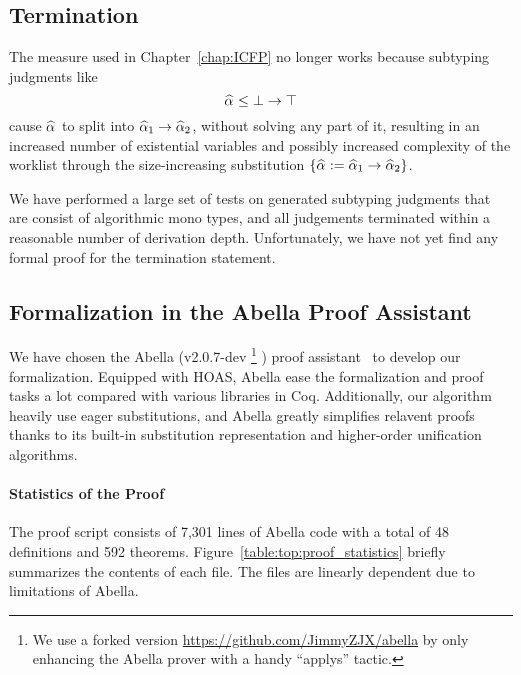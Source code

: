 \subsection{Termination}

The measure used in Chapter~\ref{chap:ICFP} no longer works because subtyping judgments like
$$\al \le \bot \to \top$$
cause $\al$ to split into $\al[1] \to \al[2]$, without solving any part of it,
resulting in an increased number of existential variables
and possibly increased complexity of the worklist through the size-increasing substitution
$\{\al := \al[1] \to \al[2]\}$.

We have performed a large set of tests on generated subtyping judgments
that are consist of algorithmic mono types,
and all judgements terminated within a reasonable number of derivation depth.
Unfortunately, we have not yet find any formal proof for the termination statement.

\subsection{Formalization in the Abella Proof Assistant}

We have chosen the Abella (v2.0.7-dev
\footnote{We use a forked version \url{https://github.com/JimmyZJX/abella} by only enhancing the Abella prover with a handy
``applys'' tactic.}
) proof assistant~\citep{AbellaDesc} to develop our formalization.
Equipped with HOAS, Abella ease the formalization and proof tasks a lot
compared with various libraries in Coq.
Additionally, our algorithm heavily use eager substitutions,
and Abella greatly simplifies relavent proofs thanks to its built-in
substitution representation and higher-order unification algorithms.

\paragraph{Statistics of the Proof}
The proof script consists of 7,301 lines of Abella code with a total of
48 definitions and 592 theorems.
Figure~\ref{table:top:proof_statistics} briefly summarizes the contents of each file.
The files are linearly dependent due to limitations of Abella.

